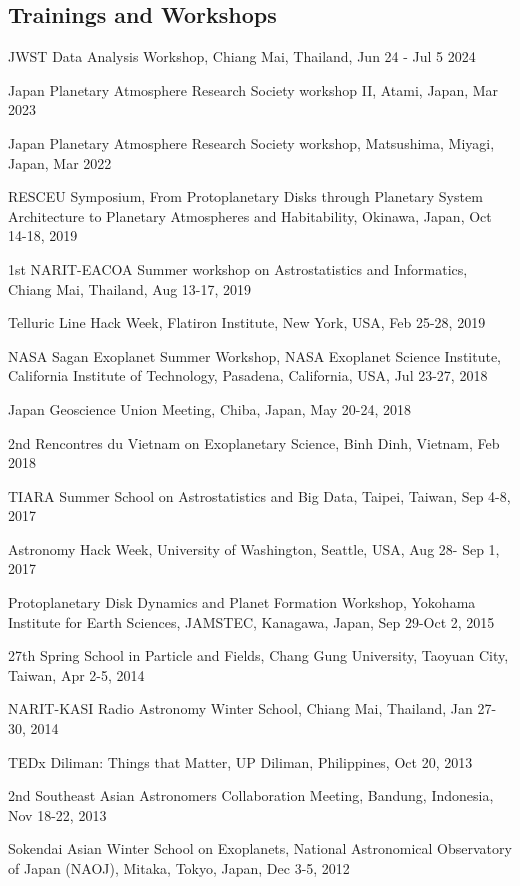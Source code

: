 \documentclass[11pt,letterpaper]{article}
\begin{document}
\subsection{Trainings and Workshops}
\begin{list}{}{\cvlist}
    \item JWST Data Analysis Workshop, Chiang Mai, Thailand, Jun 24 - Jul 5 2024
    \item Japan Planetary Atmosphere Research Society workshop II, Atami, Japan, Mar 2023
    \item Japan Planetary Atmosphere Research Society workshop, Matsushima, Miyagi, Japan, Mar 2022
    \item RESCEU Symposium, From Protoplanetary Disks through Planetary System Architecture to Planetary Atmospheres and Habitability, Okinawa, Japan, Oct 14-18, 2019
    \item 1st NARIT-EACOA Summer workshop on Astrostatistics and Informatics, Chiang Mai, Thailand, Aug 13-17, 2019
    \item Telluric Line Hack Week, Flatiron Institute, New York, USA, Feb 25-28, 2019
    \item NASA Sagan Exoplanet Summer Workshop, NASA Exoplanet Science Institute, California Institute of Technology, Pasadena, California, USA, Jul 23-27, 2018
    \item Japan Geoscience Union Meeting, Chiba, Japan, May 20-24, 2018
    \item 2nd Rencontres du Vietnam on Exoplanetary Science, Binh Dinh, Vietnam, Feb 2018
    \item TIARA Summer School on Astrostatistics and Big Data, Taipei, Taiwan, Sep 4-8, 2017
    \item Astronomy Hack Week, University of Washington, Seattle, USA, Aug 28- Sep 1, 2017
    \item Protoplanetary Disk Dynamics and Planet Formation Workshop, Yokohama Institute for Earth Sciences, JAMSTEC, Kanagawa, Japan, Sep 29-Oct 2, 2015
    \item 27th Spring School in Particle and Fields, Chang Gung University, Taoyuan City, Taiwan, Apr 2-5, 2014
    \item NARIT-KASI Radio Astronomy Winter School, Chiang Mai, Thailand, Jan 27-30, 2014
    \item TEDx Diliman: Things that Matter, UP Diliman, Philippines, Oct 20, 2013
    \item 2nd Southeast Asian Astronomers Collaboration Meeting, Bandung, Indonesia, Nov 18-22, 2013
    \item Sokendai Asian Winter School on Exoplanets, National Astronomical Observatory of Japan (NAOJ), Mitaka, Tokyo, Japan, Dec 3-5, 2012

\end{list}
\end{document}
